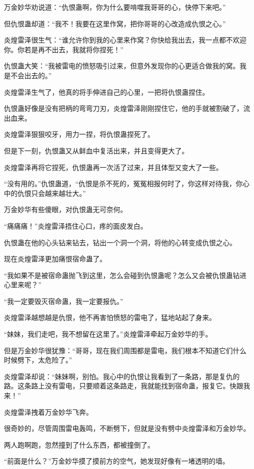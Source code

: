 \begin{this_body}
万金妙华劝说道：“仇恨蛊啊，你为什么要啃噬我哥哥的心，快停下来吧。”

但仇恨蛊却道：“我不！我要在这里作窝，把你哥哥的心改造成仇恨之心。”

炎煌雷泽很生气：“谁允许你到我的心里来作窝？你快给我出去，我一点都不欢迎你。你若是再不出去，我就将你捏死！”

仇恨蛊大笑：“我被雷电的愤怒吸引过来，但意外发现你的心更适合做我的窝。我是不会出去的。”

炎煌雷泽生气了，他真的将手伸进自己的心里，一把将仇恨蛊捏住。

仇恨蛊好像是没有把柄的弯弯刀刃，炎煌雷泽刚刚捏住它，他的手就被割破了，流出血来。

炎煌雷泽狠狠咬牙，用力一捏，将仇恨蛊捏死了。

但是下一刻，仇恨蛊又从鲜血中复活出来，并且变得更大了。

炎煌雷泽再将它捏死，仇恨蛊再一次活了过来，并且体型又变大了一些。

“没有用的。”仇恨蛊道，“仇恨是杀不死的，冤冤相报何时了，你这样对待我，你心中的仇恨只会越来越壮大。”

万金妙华有些傻眼，对仇恨蛊无可奈何。

“痛痛痛！”炎煌雷泽捂住心口，疼的面皮发白。

仇恨蛊在他的心头钻来钻去，钻出一个洞一个洞，将他的心转变成仇恨之心。

现在炎煌雷泽更加痛恨宿命蛊了。

“我如果不是被宿命蛊抛飞到这里，怎么会碰到仇恨蛊呢？怎么又会被仇恨蛊钻进心里来呢？”

“我一定要毁灭宿命蛊，我一定要报仇。”

炎煌雷泽越想越是仇恨，他不再害怕愤怒的雷电了，猛地站起了身来。

“妹妹，我们走吧，我不想留在这里了。”炎煌雷泽牵起万金妙华的手。

但是万金妙华很犹豫：“哥哥，现在我们周围都是雷电，我们根本不知道它们什么时候劈下，太危险了。”

炎煌雷泽却说：“妹妹啊，别怕。我心中的仇恨让我看到了一条路，那是复仇的路。这条路上没有雷电，只要顺着这条路走，我就能找到宿命蛊，报复它。快跟我来！”

炎煌雷泽拽着万金妙华飞奔。

很奇妙的，尽管周围雷电轰鸣，不断劈下，但就是没有劈中炎煌雷泽和万金妙华。

两人跑啊跑，忽然撞到了什么东西，都被撞倒了。

“前面是什么？”万金妙华摸了摸前方的空气，她发现好像有一堵透明的墙。


\end{this_body}
